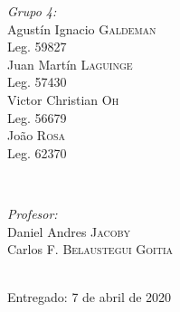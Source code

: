\begin{titlepage}
    \begin{minipage}{0.4\textwidth}
    \begin{flushleft} \large
    \emph{Grupo 4:}\\		%
    [.3cm]
   Agust\'in Ignacio \textsc{Galdeman}\\
    Leg. 59827\\ 
    [.3cm]
    Juan Mart\'in \textsc{Laguinge}\\
    Leg. 57430\\ 
    [.3cm]
    Victor Christian \textsc{Oh}\\
    Leg. 56679\\ 
    [.3cm]
    Jo\~ao \textsc{Rosa}\\
    Leg. 62370 \\ 
    [.3cm]
    \end{flushleft}
    \end{minipage}
    ~
    \begin{minipage}{0.4\textwidth}
    \begin{flushright} \large
    \emph{Profesor:} \\
    [.3cm]
    Daniel Andres  \textsc{Jacoby}\\ %
    [.3cm]
    Carlos F. \textsc{Belaustegui Goitia}\\
    \end{flushright}
    \end{minipage}\\[2cm]
        
        
        
    \vfill
    {\large Entregado: 7 de abril de 2020}\\[2cm] %
        
        
         
        
        
    \end{titlepage}